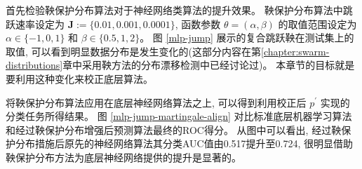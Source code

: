 首先检验鞅保护分布算法对于神经网络类算法的提升效果。 鞅保护分布算法中跳跃速率设定为 $\mathbf{J} := \{0.01,0.001,0.0001\}$, 函数参数 $\theta = (\alpha, \beta)$ 的取值范围设定为$\alpha \in \{-1,0,1\}$ 和 $\beta \in \{0.5, 1, 2\}$。 图 \ref{mlp-jump} 展示的复合跳跃鞅在测试集上的取值, 可以看到明显数据分布是发生变化的(这部分内容在第\ref{chapter:swarm-distributions}章中采用鞅方法的分布漂移检测中已经讨论过)。 本章节的目标就是要利用这种变化来校正底层算法。

将鞅保护分布算法应用在底层神经网络算法之上, 可以得到利用校正后 $p^{\prime}$ 实现的分类任务所得结果。 图 \ref{mlp-jump-martingale-align} 对比标准底层机器学习算法和经过鞅保护分布增强后预测算法最终的ROC得分。 从图中可以看出, 经过鞅保护分布措施后原先的神经网络算法其分类AUC值由0.517提升至0.724, 很明显借助鞅保护分布方法为底层神经网络提供的提升是显著的。



